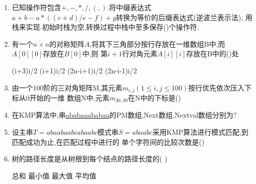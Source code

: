 \documentclass[12pt, a4paper, oneside, UTF8]{ctexbook}
\begin{document}
\begin{enumerate}
    \item \bl 已知操作符包含$+,-,*,/,(,)$.将中缀表达式$a+b-a*((c+d)/e-f)+g$转换为等价的后缀表达式(逆波兰表示法),
    用栈来实现.初始时栈为空,转换过程中栈中至多保存()个操作符. 


    \item \bt 有一个$n\times n$的对称矩阵$A$,将其下三角部分按行存放在一维数组B中,而$A[0][0]$存放在$B[0]$中,则
    第$i+1$行对角元素$A[i][i]$存放在B中的()处 
    \begin{choices}
        \task (i+3)i/2 
        \task (i+1)i/2
        \task (2n-i+1)i/2
        \task (2n-i-1)i/2 
    \end{choices}

    \item \bl 由一个100阶的三对角矩阵M,其元素$m_{i,j}(1\leq i, j\leq 100)$按行优先依次压入下标从0开始的一维
    数组N中.元素$m_{30,30}$在N中的下标是() 

    \item \bt 在KMP算法中,串\underline{ababaaababaa}的PM数组,Next数组,Nextval数组分别为? 
    \item \bl 设主串$T=abaabaabcabaabc$模式串$S=abaabc$采用KMP算法进行模式匹配,到匹配成功为止,在匹配过程中进行的
    单个字符间的比较次数是()
    
    \item 树的路径长度是从树根到每个结点的路径长度的(   ) 
    \begin{choices}
        \task 总和
        \task 最小值
        \task 最大值
        \task 平均值
    \end{choices}


\end{enumerate}
\end{document}
